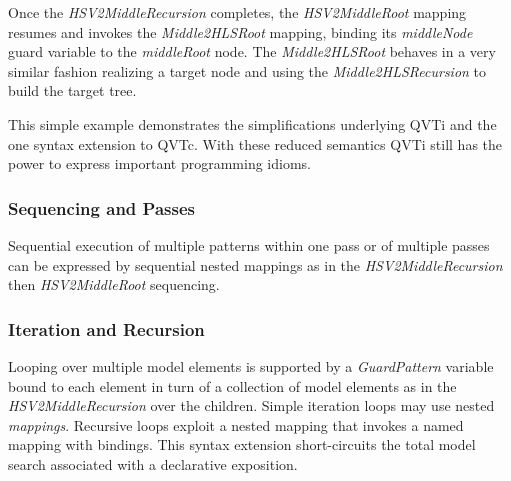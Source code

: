 Once the \textit{HSV2MiddleRecursion} completes, the \textit{HSV2MiddleRoot} mapping resumes and invokes the \textit{Middle2HLSRoot} mapping, binding its \textit{middleNode} guard variable to the \textit{middleRoot} node. The \textit{Middle2HLSRoot} behaves in a very similar fashion realizing a target node and using the \textit{Middle2HLSRecursion} to build the target tree.

This simple example demonstrates the simplifications underlying QVTi and the one syntax extension to QVTc. With these reduced semantics QVTi still has the power to express important programming idioms.


\subsubsection{Sequencing and Passes}
Sequential execution of multiple patterns within one pass or of multiple passes can be expressed by sequential nested mappings as in the \textit{HSV2MiddleRecursion} then \textit{HSV2MiddleRoot} sequencing.

\subsubsection{Iteration and Recursion}
Looping over multiple model elements is supported by a \textit{GuardPattern} variable bound to each element in turn of a collection of model elements as in the \textit{HSV2MiddleRecursion} over the children. Simple iteration loops may use nested \textit{mappings}. Recursive loops exploit a nested mapping that invokes a named mapping with bindings. This syntax extension short-circuits the total model search associated with a declarative exposition.  

